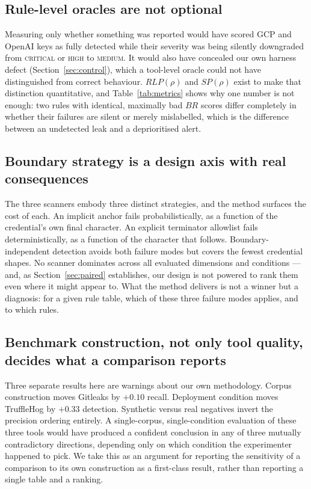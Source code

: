 \documentclass[journal]{IEEEtran}
\begin{document}
\subsection{Rule-level oracles are not optional}

Measuring only whether something was reported would have scored GCP and OpenAI keys as fully detected while their severity was being silently downgraded from \textsc{critical} or \textsc{high} to \textsc{medium}. It would also have concealed our own harness defect (Section~\ref{sec:control}), which a tool-level oracle could not have distinguished from correct behaviour. $RLP(\rho)$ and $SP(\rho)$ exist to make that distinction quantitative, and Table~\ref{tab:metrics} shows why one number is not enough: two rules with identical, maximally bad $BR$ scores differ completely in whether their failures are silent or merely mislabelled, which is the difference between an undetected leak and a deprioritised alert.

\subsection{Boundary strategy is a design axis with real consequences}

The three scanners embody three distinct strategies, and the method surfaces the cost of each. An implicit anchor fails probabilistically, as a function of the credential's own final character. An explicit terminator allowlist fails deterministically, as a function of the character that follows. Boundary-independent detection avoids both failure modes but covers the fewest credential shapes. No scanner dominates across all evaluated dimensions and conditions --- and, as Section~\ref{sec:paired} establishes, our design is not powered to rank them even where it might appear to. What the method delivers is not a winner but a diagnosis: for a given rule table, which of these three failure modes applies, and to which rules.

\subsection{Benchmark construction, not only tool quality, decides what a comparison reports}

Three separate results here are warnings about our own methodology. Corpus construction moves Gitleaks by $+0.10$ recall. Deployment condition moves TruffleHog by $+0.33$ detection. Synthetic versus real negatives invert the precision ordering entirely. A single-corpus, single-condition evaluation of these three tools would have produced a confident conclusion in any of three mutually contradictory directions, depending only on which condition the experimenter happened to pick. We take this as an argument for reporting the sensitivity of a comparison to its own construction as a first-class result, rather than reporting a single table and a ranking.
\end{document}
